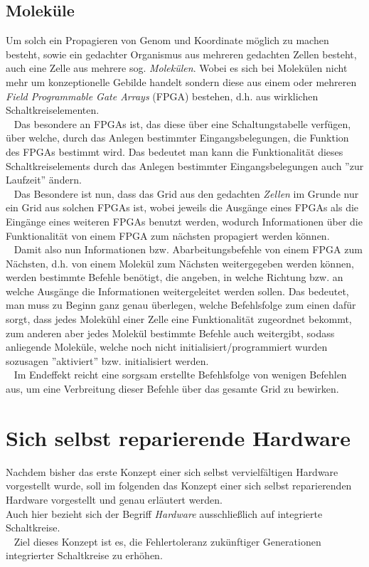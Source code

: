 \documentclass[12p, a4]{article}
\begin{document}
\subsection{Moleküle}
Um solch ein Propagieren von Genom und Koordinate möglich zu machen
besteht, sowie ein gedachter Organismus aus mehreren gedachten Zellen besteht,
auch eine Zelle aus mehrere sog. \textit{Molekülen}. Wobei es sich bei
Molekülen nicht mehr um konzeptionelle Gebilde handelt sondern diese aus
einem oder mehreren \textit{Field Programmable Gate Arrays} (FPGA) bestehen,
d.h. aus wirklichen Schaltkreiselementen.\\
\ \newline
Das besondere an FPGAs ist, das diese über eine Schaltungstabelle verfügen,
über welche, durch das Anlegen bestimmter Eingangsbelegungen, die Funktion
des FPGAs bestimmt wird. Das bedeutet man kann die Funktionalität dieses
Schaltkreiselements durch das Anlegen bestimmter Eingangsbelegungen auch
''zur Laufzeit'' ändern.\\
\ \newline
Das Besondere ist nun, dass das Grid aus den gedachten \textit{Zellen}
im Grunde nur ein Grid aus solchen FPGAs ist, wobei jeweils die Ausgänge
eines FPGAs als die Eingänge eines weiteren FPGAs benutzt werden, wodurch
Informationen über die Funktionalität von einem FPGA zum nächsten propagiert
werden können.\\
\ \newline
Damit also nun Informationen bzw. Abarbeitungsbefehle von einem FPGA zum
Nächsten, d.h. von einem Molekül zum Nächsten weitergegeben werden können,
werden bestimmte Befehle benötigt, die angeben, in welche Richtung bzw.
an welche Ausgänge die Informationen weitergeleitet werden sollen.
Das bedeutet, man muss zu Beginn ganz genau überlegen, welche Befehlsfolge
zum einen dafür sorgt, dass jedes Molekühl einer Zelle eine Funktionalität
zugeordnet bekommt, zum anderen aber jedes Molekül bestimmte Befehle auch
weitergibt, sodass anliegende Moleküle, welche noch nicht
initialisiert/programmiert wurden sozusagen ''aktiviert'' bzw. initialisiert
werden.\\
\ \newline
Im Endeffekt reicht eine sorgsam erstellte Befehlsfolge von wenigen Befehlen
aus, um eine Verbreitung dieser Befehle über das gesamte Grid zu bewirken.\\


\section{Sich selbst reparierende Hardware}
Nachdem bisher das erste Konzept einer sich selbst vervielfältigen Hardware
vorgestellt wurde, soll im folgenden das Konzept einer sich selbst
reparierenden Hardware vorgestellt und genau erläutert werden.\\
Auch hier bezieht sich der Begriff \textit{Hardware} ausschließlich auf
integrierte Schaltkreise.\\
\ \newline
Ziel dieses Konzept ist es, die Fehlertoleranz
zukünftiger Generationen integrierter Schaltkreise zu erhöhen.\\
\end{document}
